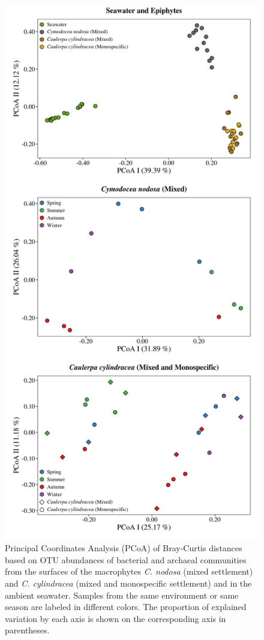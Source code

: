 \documentclass[12pt,]{article}
\begin{document}
\begin{figure}[H]

{\centering \includegraphics[width=0.55\linewidth]{../results/figures/pcoa_figure} 

}

\caption{Principal Coordinates Analysis (PCoA) of Bray-Curtis distances based on OTU abundances of bacterial and archaeal communities from the surfaces of the macrophytes \textit{C. nodosa} (mixed settlement) and \textit{C. cylindracea} (mixed and monospecific settlement) and in the ambient seawater. Samples from the same environment or same season are labeled in different colors. The proportion of explained variation by each axis is shown on the corresponding axis in parentheses.\label{pcoa}}\label{fig:unnamed-chunk-3}
\end{figure}
\end{document}
